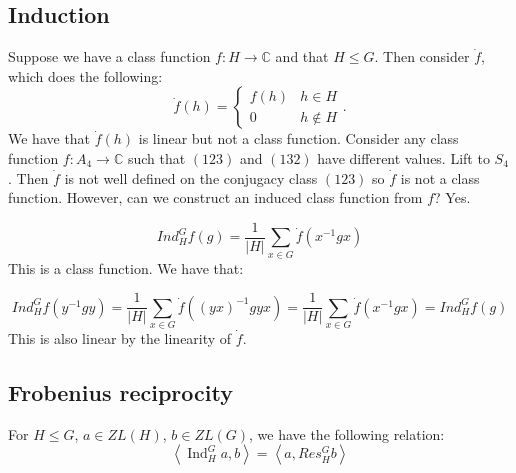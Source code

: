 \documentclass[]{report}
\theoremstyle{definition}
\numberwithin{theorem}{section}
\numberwithin{equation}{section}
\newcommand{\ind}{\operatorname{Ind}}
\begin{document}
\subsection{Induction}
Suppose we have a class function $f: H \rightarrow \mathbb{C}$ and that $H \leq G$. Then consider $\dot{f}$, which does the following:
\begin{equation}
	\dot{f}(h) =
	\begin{cases}
		f(h) & h \in H\\
		0 & h \notin H
	\end{cases}.
\end{equation}
We have that $\dot{f}(h)$ is linear but not a class function.
Consider any class function $f: A_4 \rightarrow \mathbb{C}$ such that $(123)$ and $(132)$ have different values. Lift to $S_4$. Then $\dot{f}$ is not well defined on the conjugacy class $(123)$ so $\dot{f}$ is not a class function.
However, can we construct an induced class function from $f$? Yes. 

\begin{equation}
	Ind^G_H f(g) = \frac{1}{|H|} \sum_{x \in G} \dot{f}(x^{-1} g x)
\end{equation}
This is a class function. We have that:

\begin{equation}
	Ind^G_H f(y^{-1}g y) = \frac{1}{|H|} \sum_{x \in G} \dot{f}((yx)^{-1} g yx) = \frac{1}{|H|} \sum_{x \in G} \dot{f}(x^{-1} g x) = Ind^G_H f(g) 
\end{equation}
This is also linear by the linearity of $\dot{f}$. 

\subsection{Frobenius reciprocity}
For $H \leq G$, $a \in ZL(H)$, $b \in ZL(G)$, we have the following relation:
\begin{equation}
	\left\langle \ind^G_H a ,b \right\rangle = \left\langle a , Res^G_H b \right\rangle 
\end{equation}
\end{document}
